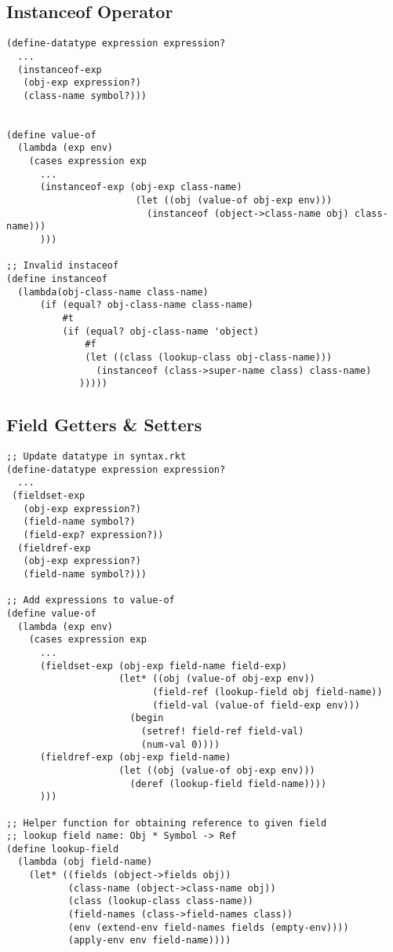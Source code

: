 \documentclass[../main.tex]{subfiles}
\begin{document}
\subsection{Instanceof Operator}

\begin{lstlisting}
(define-datatype expression expression?
  ...
  (instanceof-exp
   (obj-exp expression?)
   (class-name symbol?)))


(define value-of
  (lambda (exp env)
    (cases expression exp
      ...
      (instanceof-exp (obj-exp class-name)
                       (let ((obj (value-of obj-exp env)))
                         (instanceof (object->class-name obj) class-name)))
      )))

;; Invalid instaceof
(define instanceof
  (lambda(obj-class-name class-name)
      (if (equal? obj-class-name class-name)
          #t
          (if (equal? obj-class-name 'object)
              #f
              (let ((class (lookup-class obj-class-name)))
                (instanceof (class->super-name class) class-name)
             )))))
\end{lstlisting}

\subsection{Field Getters \& Setters}

\begin{lstlisting}
;; Update datatype in syntax.rkt
(define-datatype expression expression?
  ...
 (fieldset-exp
   (obj-exp expression?)
   (field-name symbol?)
   (field-exp? expression?))
  (fieldref-exp
   (obj-exp expression?)
   (field-name symbol?)))

;; Add expressions to value-of
(define value-of
  (lambda (exp env)
    (cases expression exp
      ...
      (fieldset-exp (obj-exp field-name field-exp)
                    (let* ((obj (value-of obj-exp env))
                          (field-ref (lookup-field obj field-name))
                          (field-val (value-of field-exp env)))
                      (begin
                        (setref! field-ref field-val)
                        (num-val 0))))
      (fieldref-exp (obj-exp field-name)
                    (let ((obj (value-of obj-exp env)))
                      (deref (lookup-field field-name))))
      )))

;; Helper function for obtaining reference to given field
;; lookup field name: Obj * Symbol -> Ref
(define lookup-field
  (lambda (obj field-name)
    (let* ((fields (object->fields obj))
           (class-name (object->class-name obj))
           (class (lookup-class class-name))
           (field-names (class->field-names class))
           (env (extend-env field-names fields (empty-env))))
           (apply-env env field-name))))
\end{lstlisting}
\end{document}
